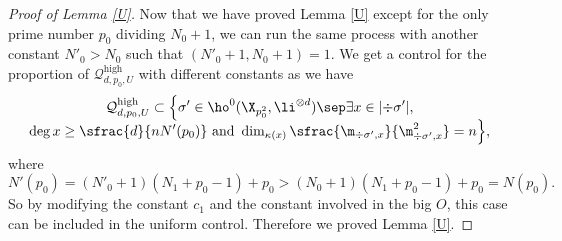 \begin{proof}[Proof of Lemma \ref{U}]
Now that we have proved Lemma \ref{U} except for the only prime number $p_0$ dividing $N_0+1$, we can run the same process with another constant $N'_0> N_0$ such that $(N'_0+1,N_0+1)=1$. We get a control for the proportion of $\mathcal{Q}_{d,p_0,U}^{\mathrm{high}}$ with different constants as we have
\begin{multline*}
\mathcal{Q}_{d,p_0,U}^{\mathrm{high}}\subset \Bigl\{ \sigma'\in \ho^0(\X_{p_0^2}, \li^{\otimes d})\sep \exists x\in |{\div\sigma'}|,\\[-5pt]\deg x\geq \sfrac{d}{nN'(p_0)}\text{ and } \dim_{\kappa(x)}\sfrac{\m_{\div \sigma',x}}{\m^2_{\div \sigma', x}}=n \Bigr\},
\end{multline*}
where
\[
N'(p_0)=(N'_0+1)(N_1+p_0-1)+p_0>(N_0+1)(N_1+p_0-1)+p_0=N(p_0).
\]
So by modifying the constant $c_1$ and the constant involved in the big $O$, this case can be included in the uniform control. Therefore we proved Lemma \ref{U}.
\end{proof}

